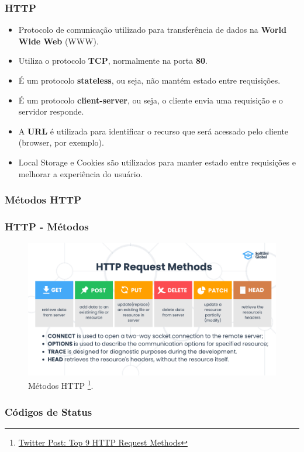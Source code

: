 \documentclass[
	10pt, %
	t, %
]{beamer}
\newcommand{\iconLink}[2]{\href{#1}{\faLink \hspace{0.2em} {#2}}}
\begin{document}
\begin{frame}
	\frametitle{HTTP}
	
	\begin{itemize}
		\item \alert{Protocolo} de comunicação utilizado para transferência de dados na \textbf{World Wide Web} (WWW).
		\item Utiliza o protocolo \textbf{TCP}, normalmente na porta \textbf{80}.
		\item É um protocolo \textbf{stateless}, ou seja, não mantém estado entre requisições.
		\item É um protocolo \textbf{client-server}, ou seja, o cliente envia uma requisição e o servidor responde.
		\item A \textbf{URL} é utilizada para identificar o recurso que será acessado pelo cliente (browser, por exemplo).
		\item \alert{Local Storage e Cookies} são utilizados para manter estado entre requisições e melhorar a experiência do usuário.
	\end{itemize}

\end{frame}

\subsubsection{Métodos HTTP}

\begin{frame}
	\frametitle{HTTP - Métodos}

	\begin{figure}
		\centering
		\includegraphics[width=0.7\linewidth]{methods.png}
		\caption{Métodos HTTP \footnote{\iconLink{https://pbs.twimg.com/media/F3Aak4jXoAAl4-y?format=jpg&name=large}{Twitter Post: Top 9 HTTP Request Methods}}.}
		\label{fig:httpmethods}
	\end{figure}

\end{frame}

\subsubsection{Códigos de Status}
\end{document}
